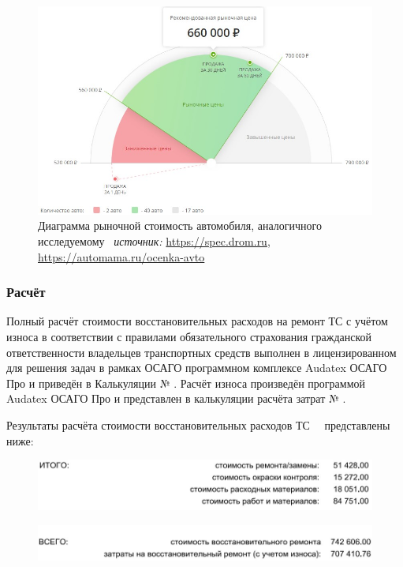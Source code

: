\begin{figure}[H]
	\centering
	\includegraphics[width=0.65\linewidth]{images/1}
	\caption[]{Диаграмма рыночной стоимость автомобиля, аналогичного исследуемому \, \textsl{источник:} \url{https://spec.drom.ru}, \url{https://automama.ru/ocenka-avto}}
	\label{fig:1}
\end{figure}

    
   \subsubsection{ Расчёт}
    
 Полный расчёт стоимости восстановительных расходов на ремонт ТС с учётом износа в соответствии с правилами обязательного страхования гражданской ответственности владельцев транспортных средств выполнен в  лицензированном для решения задач в рамках ОСАГО программном комплексе   Audatex ОСАГО Про и приведён в Калькуляции № \NomerDoc.
 Расчёт износа произведён программой  Audatex ОСАГО Про и представлен  в калькуляции расчёта затрат № \NomerDoc.

    \indent Результаты расчёта  стоимости восстановительных расходов ТС \, \, представлены ниже:
    \begin{figure}[H]
    	\centering
    	\includegraphics[width=0.95\linewidth]{images/Screenshot_1}
    \end{figure}
    \begin{figure}[H]
    	\centering
    	\includegraphics[width=0.95\linewidth]{images/Screenshot_2}
    \end{figure}
    \medskip
    \renewcommand\baselinestretch{1.2}\small\normalsize
    

